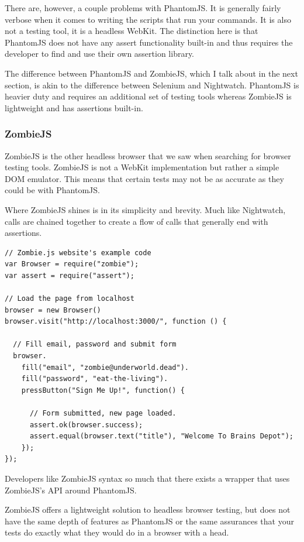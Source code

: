 \documentclass[12pt]{ucthesis}
\begin{document}
There are, however, a couple problems with PhantomJS. It is generally fairly verbose when it comes to writing the scripts that run your commands. It is also not a testing tool, it is a headless WebKit. The distinction here is that PhantomJS does not have any assert functionality built-in and thus requires the developer to find and use their own assertion library.

The difference between PhantomJS and ZombieJS, which I talk about in the next section, is akin to the difference between Selenium and Nightwatch. PhantomJS is heavier duty and requires an additional set of testing tools whereas ZombieJS is lightweight and has assertions built-in.

\subsubsection{ZombieJS}
ZombieJS\cite{ZombieJS} is the other headless browser that we saw when searching for browser testing tools. ZombieJS is not a WebKit implementation but rather a simple DOM emulator. This means that certain tests may not be as accurate as they could be with PhantomJS.

Where ZombieJS shines is in its simplicity and brevity. Much like Nightwatch, calls are chained together to create a flow of calls that generally end with assertions.

\begin{lstlisting}
// Zombie.js website's example code
var Browser = require("zombie");
var assert = require("assert");

// Load the page from localhost
browser = new Browser()
browser.visit("http://localhost:3000/", function () {

  // Fill email, password and submit form
  browser.
    fill("email", "zombie@underworld.dead").
    fill("password", "eat-the-living").
    pressButton("Sign Me Up!", function() {

      // Form submitted, new page loaded.
      assert.ok(browser.success);
      assert.equal(browser.text("title"), "Welcome To Brains Depot");
    });
});
\end{lstlisting}

Developers like ZombieJS syntax so much that there exists a wrapper that uses ZombieJS's API around PhantomJS\cite{ZombiePhantom}.

ZombieJS offers a lightweight solution to headless browser testing, but does not have the same depth of features as PhantomJS or the same assurances that your tests do exactly what they would do in a browser with a head.
\end{document}
